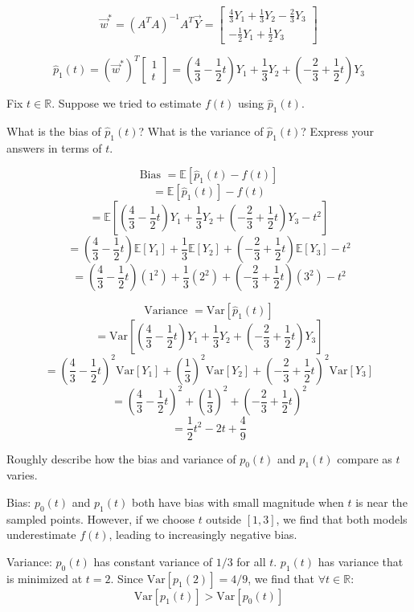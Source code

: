 \begin{Parts}
\begin{solution}

$$
  \vec{w}^* = (A^T A)^{-1} A^T \vec{Y} =
  \begin{bmatrix}
      \frac{4}{3}Y_1 + \frac{1}{3}Y_2 - \frac{2}{3}Y_3 \\
      - \frac{1}{2}Y_1 + \frac{1}{2}Y_3
  \end{bmatrix}
$$

$$ \hat{p}_1(t) = (\vec{w}^*)^T \begin{bmatrix} 1 \\ t \end{bmatrix} =
  (\frac{4}{3} - \frac{1}{2}t) Y_1 + \frac{1}{3} Y_2 + (-\frac{2}{3} + \frac{1}{2}t) Y_3 $$

\end{solution}

\Part
Fix $t \in \mathbb{R}$. Suppose we tried to estimate $f(t)$ using $\hat{p}_1(t)$.

What is the bias of $\hat{p}_1(t)$? What is the variance of $\hat{p}_1(t)$? Express your answers in terms of $t$.

\begin{solution}
$$ \text{Bias } = \mathbb{E} \left[ \hat{p}_1(t) - f(t) \right]$$
$$ = \mathbb{E} \left[ \hat{p}_1(t) \right] - f(t) $$
$$ = \mathbb{E} \left[ (\frac{4}{3} - \frac{1}{2}t) Y_1 + \frac{1}{3} Y_2 + (-\frac{2}{3} + \frac{1}{2}t) Y_3 -t^2 \right] $$
$$ = (\frac{4}{3} - \frac{1}{2}t) \mathbb{E}[Y_1] + \frac{1}{3} \mathbb{E}[Y_2] + (-\frac{2}{3} + \frac{1}{2}t) \mathbb{E}[Y_3] -t^2 $$
$$ = (\frac{4}{3} - \frac{1}{2}t) (1^2) + \frac{1}{3} (2^2) + (-\frac{2}{3} + \frac{1}{2}t) (3^2) -t^2 $$

$$ \text{Variance } = \text{Var} \left[ \hat{p}_1(t) \right]$$
$$ = \text{Var} \left[ (\frac{4}{3} - \frac{1}{2}t) Y_1 + \frac{1}{3} Y_2 + (-\frac{2}{3} + \frac{1}{2}t) Y_3 \right] $$
$$ = (\frac{4}{3} - \frac{1}{2}t)^2 \text{Var}[Y_1] + (\frac{1}{3})^2 \text{Var}[Y_2] + (-\frac{2}{3} + \frac{1}{2}t)^2 \text{Var}[Y_3] $$
$$ = (\frac{4}{3} - \frac{1}{2}t)^2 + (\frac{1}{3})^2 + (-\frac{2}{3} + \frac{1}{2}t)^2 $$
$$ = \frac{1}{2}t^2 - 2t + \frac{4}{9} $$
\end{solution}

\Part
Roughly describe how the bias and variance of $p_0(t)$ and $p_1(t)$ compare as $t$ varies.

\begin{solution}
  \newline
  Bias: $p_0(t)$ and $p_1(t)$ both have bias with small magnitude when $t$ is near the sampled points. However, if we choose $t$ outside $[1, 3]$, we find that both models underestimate $f(t)$, leading to increasingly negative bias.

  Variance: $p_0(t)$ has constant variance of $1/3$ for all $t$. $p_1(t)$ has variance that is minimized at $t=2$.
  Since $\text{Var}[p_1(2)] = 4/9$, we find that $\forall t \in \mathbb{R} $:
  $$\text{Var}[p_1(t)] > \text{Var}[p_0(t)] $$
\end{solution}

\end{Parts}
\newpage
